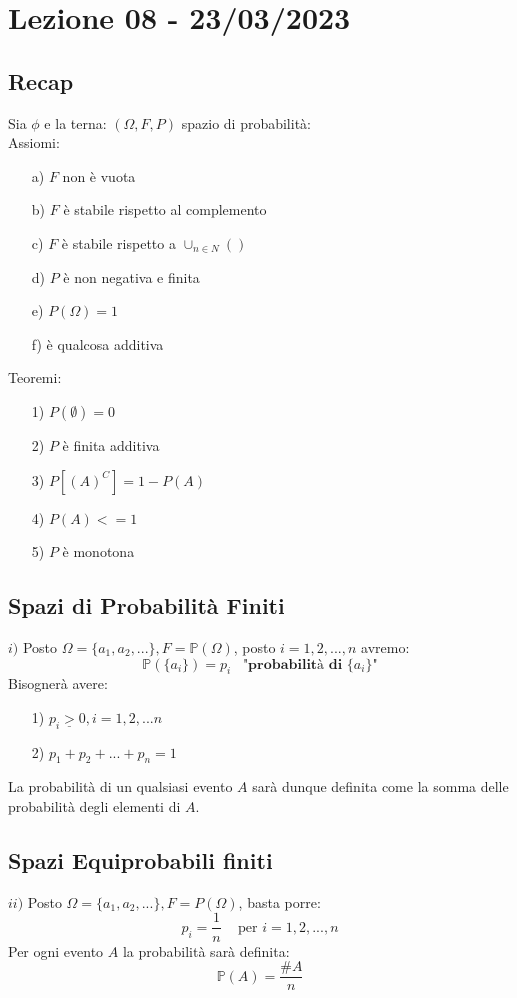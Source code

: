 \section{Lezione 08 - 23/03/2023}

\subsection{Recap}
Sia $\phi$ e la terna: $(\Omega, F, P)$ spazio di probabilità:\\
Assiomi:
\begin{itemize}
\item[a)] $F$ non è vuota
\item[b)] $F$ è stabile rispetto al complemento
\item[c)] $F$ è stabile rispetto a $\cup_{n \in N}()$
\item[d)] $P$ è non negativa e finita
\item[e)] $P(\Omega) = 1$
\item[f)] è qualcosa additiva
\end{itemize}
Teoremi:
\begin{itemize}
\item[1)] $P(\emptyset) = 0$
\item[2)] $P$ è finita additiva
\item[3)] $P[(A)^C] = 1-P(A)$
\item[4)] $P(A) <= 1$
\item[5)] $P$ è monotona
\end{itemize}

\subsection{Spazi di Probabilità Finiti}
$i)$ Posto $\Omega = \{a_1, a_2,...\}, F = \mathbb{P}(\Omega)$, posto $ i=1,2,...,n$ avremo:
$$  \mathbb{P}(\{a_i\}) = \textit{p}_i \;\;\; \textbf{"probabilità di \{$a_i$\}"} $$
Bisognerà avere:
\begin{itemize}
\item[1)] $ \textit{p}_i \underline{>} 0, i=1,2,...n $
\item[2)] $ \textit{p}_1 +   \textit{p}_2 +  ... +  \textit{p}_n  = 1 $
\end{itemize}
La probabilità di un qualsiasi evento $A$ sarà dunque definita come la somma delle probabilità degli elementi di $A$.

\subsection{Spazi Equiprobabili finiti}
$ii)$ Posto $\Omega = \{a_1, a_2,...\}, F = P(\Omega)$, basta porre:
$$ \textit{p}_i = \frac{1}{n} \;\;\; \text{ per } i=1,2,...,n $$
Per ogni evento $A$ la probabilità sarà definita:
$$ \mathbb{P}(A) = \frac{\#A}{n} $$

